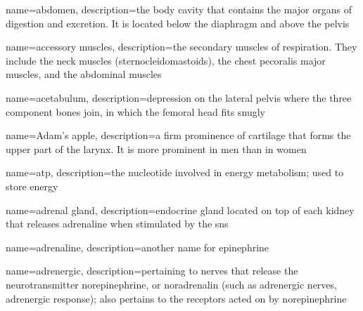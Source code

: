 \documentclass[../../EMT-169.tex]{subfiles}
\begin{document}
\setcounter{chapter}{5}
\label{ch:chapter6}
\clearpage


	{
		name=abdomen,
		description={the body cavity that contains the major organs of digestion and excretion. It is located below the diaphragm and above the pelvis}
	}

	{
		name=accessory muscles,
		description={the secondary muscles of respiration.  They include the neck muscles (sternocleidomastoids), the chest pecoralis major muscles, and the abdominal muscles}
	}

	{
		name=acetabulum,
		description={depression on the lateral pelvis where the three component bones join, in which the femoral head fits snugly}
	}
	
	{
		name=Adam's apple,
		description={a firm prominence of cartilage that forms the upper part of the larynx. It is more prominent in men than in women}
	}

	{
		name=\acrlong{atp},
		description={the nucleotide involved in energy metabolism; used to store energy}
	}
	
	{
		name=adrenal gland,
		description={endocrine gland located on top of each kidney that releases adrenaline when stimulated by the \acrlong{sns}}
	}
	
	{
		name=adrenaline,
		description={another name for epinephrine}
	}
	
	{
		name=adrenergic,
		description={pertaining to nerves that release the neurotransmitter norepinephrine, or noradrenalin (such as adrenergic nerves, adrenergic response); also pertains to the receptors acted on by norepinephrine}
	}
	
\end{document}
